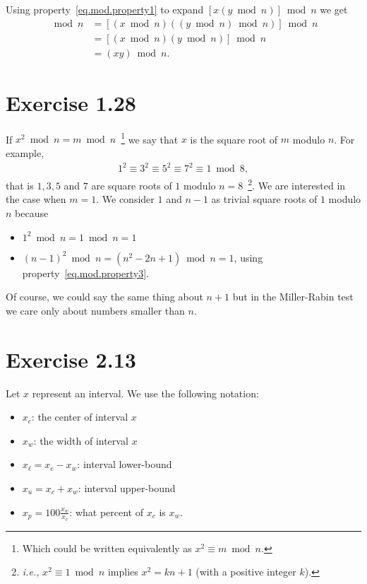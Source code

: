 \documentclass[12pt,a4paper]{article}
\begin{document}
Using property~\eqref{eq.mod.property1} to expand $[x(y\bmod n)]\bmod n$ we get
\begin{align*}
  [x(y\bmod n)]\bmod n
  &= [(x\bmod n)((y\bmod n)\bmod n)]\bmod n \\
  &= [(x\bmod n)(y\bmod n)]\bmod n \\
  &= (xy)\bmod n.
\end{align*}

\section{Exercise 1.28}

If $x^2 \bmod n = m \bmod n$~\footnote{Which could be written equivalently as $x^2
\equiv m \bmod n$.} we say that $x$ is the square root of $m$ modulo $n$. For example,
\begin{align*}
  1^2 \equiv 3^2 \equiv 5^2 \equiv 7^2 \equiv 1 \bmod 8,
\end{align*}
that is $1, 3, 5$ and $7$ are square roots of $1$ modulo $n=8$~\footnote{\emph{i.e.,}
$x^2 \equiv 1 \bmod n$ implies $x^2 = kn + 1$ (with a positive integer $k$).}. We are
interested in the case when $m = 1$. We consider $1$ and $n-1$ as trivial square roots
of $1$ modulo $n$ because
\begin{itemize}
\item $1^2 \bmod n = 1 \bmod n = 1$
\item $(n-1)^2 \bmod n = (n^2 - 2n + 1) \bmod n = 1$, using property~\eqref{eq.mod.property3}.
\end{itemize}
Of course, we could say the same thing about $n+1$ but in the Miller-Rabin test we care
only about numbers smaller than $n$.

\section{Exercise 2.13}

Let $x$ represent an interval. We use the following notation:
\begin{itemize}
\item $x_c$: the center of interval $x$
\item $x_w$: the width of interval $x$
\item $x_{\ell} = x_c - x_w$: interval lower-bound
\item $x_{u} = x_c + x_w$: interval upper-bound
\item $x_p = 100\frac{x_w}{x_c}$: what percent of $x_c$ is $x_w$.
\end{itemize}
\end{document}
